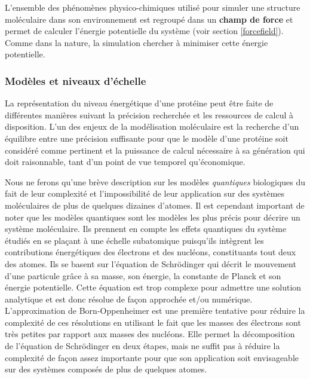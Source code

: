 L'ensemble des phénomènes physico-chimiques utilisé pour simuler une structure moléculaire dans son environnement est regroupé dans un \textbf{champ de force} et permet de calculer l'énergie potentielle du système (voir section \ref{forcefield}). Comme dans la nature, la simulation chercher à minimiser cette énergie potentielle.

\subsubsection{Modèles et niveaux d'échelle}

La représentation du niveau énergétique d'une protéine peut être faite de différentes manières suivant la précision recherchée et les ressources de calcul à disposition. L'un des enjeux de la modélisation moléculaire est la recherche d'un équilibre entre une précision suffisante pour que le modèle d'une protéine soit considéré comme pertinent et la puissance de calcul nécessaire à sa génération qui doit raisonnable, tant d'un point de vue temporel qu'économique.

 \label{quantic}

Nous ne ferons qu'une brève description sur les modèles \textit{quantiques} biologiques du fait de leur complexité et l'impossibilité de leur application sur des systèmes moléculaires de plus de quelques dizaines d'atomes. Il est cependant important de noter que les modèles quantiques sont les modèles les plus précis pour décrire un système moléculaire. Ils prennent en compte les effets quantiques du système étudiés en se plaçant à une échelle subatomique puisqu'ils intègrent les contributions énergétiques des électrons et des nucléons, constituants tout deux des atomes. Ils se basent sur l'équation de Schrödinger \cite{schrodinger1926undulatory} qui décrit le mouvement d'une particule grâce à sa masse, son énergie, la constante de Planck et son énergie potentielle. Cette équation est trop complexe pour admettre une solution analytique et est donc résolue de façon approchée et/ou numérique. L'approximation de Born-Oppenheimer \cite{born1927quantentheorie} est une première tentative pour réduire la complexité de ces résolutions en utilisant le fait que les masses des électrons sont très petites par rapport aux masses des nucléons. Elle permet la décomposition de l'équation de Schrödinger en deux étapes, mais ne suffit pas à réduire la complexité de façon assez importante pour que son application soit envisageable sur des systèmes composés de plus de quelques atomes.

